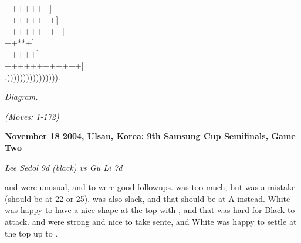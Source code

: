 \documentclass[letterpaper,12pt]{memoir}
\newcounter{GoFigure}[part]
\newcommand{\gofigure}{%
 \stepcounter{GoFigure}
 \centerline{\textit{Diagram.\thinspace\arabic{GoFigure}}}
}
\newcommand{\subtext}[1]{\centerline{\textit{#1}}}
\begin{document}
{{++++{\gnoswi{}}{\gnosbi{}}{\gnosbi{}}{\gnoswi{}}+{\gnoswi{}}{\gnoswi{}}{\gnoswi{}}++]\\
+++{\gnosbi{}}{\gnosbi{}}{\gnoswi{}}{\gnoswi{}}{\gnosbi{}}++++{\gnosbi{}}+]\\
{\gnosbi{}}{\gnoswi{}}{\gnoswi{}}++++{\gnosbi{}}{\gnoswi{}}++{\gnosbi{}}{\gnosbi{}}++{\gnoswi{}}{\gnosbi{}}+]\\
++{\gnoswi{}}{\gnoswi{}}*{\gnoswi{}}{\gnoswi{}}{\gnosbi{}}{\gnosbi{}}{\gnoswi{}}*{\gnosbi{}}+]\\
++{\gnosbi{}}+{\gnoswi{}}{\gnosbi{}}{\gnoswi{}}{\gnosbi{}}{\gnoswi{}}++]\\
+++++++++{\gnoswi{}}{\gnosbi{}}{\gnoswi{}}{\gnosbi{}}{\gnosbi{}}+++]\\
,)))))))))){\gnoswi{}})))))).\\
}
}
\gofigure
\subtext{(Moves: 1-172)}

\textbf{November 18 2004, Ulsan, Korea: 9th Samsung Cup Semifinals, Game Two}

\textit{Lee Sedol 9d (black) vs Gu Li 7d}

{} and {} were unusual, and {} to {} were good followups.
{} was too much, but {} was a mistake (should be at 22 or 25).
 {} was also slack, and that should be at A instead.
White was happy to have a nice shape at the top with {}, and that was hard for Black to attack.
{} and {} were strong and nice to take sente, and White was happy to settle at the top up to {}.
\end{document}
